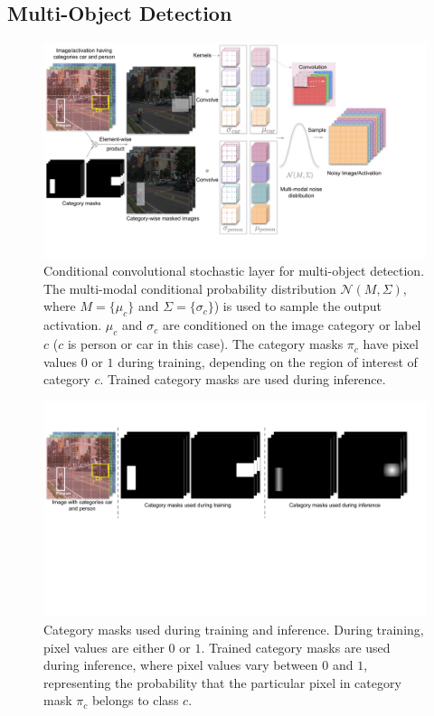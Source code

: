 \documentclass[12pt, letterpaper]{article}
\begin{document}
\subsection{Multi-Object Detection}
\begin{figure}[h!]
    \centering
    \includegraphics[width=\textwidth, trim={0cm 1.6cm 2.7cm 0cm}, clip]{Detection Conditional noise layer.pdf}
    \caption{Conditional convolutional stochastic layer for multi-object detection. The multi-modal conditional probability distribution $\mathcal{N}(M, \Sigma)$, where $M=\{\mu_c\}$ and $\Sigma=\{\sigma_c\}$) is used to sample the output activation. $\mu_c$ and $\sigma_c$ are conditioned on the image category or label $c$ ($c$ is person or car in this case). The category masks $\pi_c$ have pixel values $0$ or $1$ during training, depending on the region of interest of category $c$. Trained category masks are used during inference.}
    \label{fig:det}
\end{figure}

\begin{figure}[h!]
    \centering
    \includegraphics[width=\textwidth, trim={0cm 7cm 1cm 2cm}, clip]{category_masks.pdf}
    \caption{Category masks used during training and inference. During training, pixel values are either $0$ or $1$. Trained category masks are used during inference, where pixel values vary between $0$ and $1$, representing the  probability that the particular pixel in category mask $\pi_c$ belongs to class $c$.}
    \label{fig:category_masks_det}
\end{figure}
\end{document}
